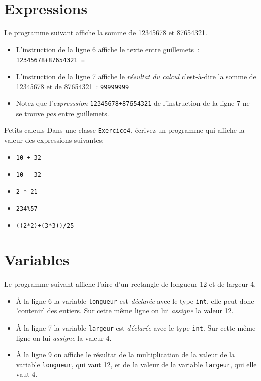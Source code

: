 \documentclass[a4paper,11pt]{article}
\begin{document}
\section{Expressions}

	Le programme suivant affiche la somme de 12345678 et 87654321.
	

	\begin{itemize}
		\item	L'instruction de la ligne 6 affiche le texte entre guillemets~: \texttt{12345678+87654321 = }
	
		\item L'instruction de la ligne 7 affiche le \emph{résultat du calcul} 
			c'est-à-dire la somme de 12345678 et de 87654321~:  \texttt{99999999}
	
		\item Notez que l'\emph{expresssion} \texttt{12345678+87654321} 
			de l'instruction de la ligne 7 ne se trouve \emph{pas} entre guillemets.
	\end{itemize}


	\begin{Exercice}{Petits calculs}
		Dans une classe \texttt{Exercice4}, écrivez un programme qui affiche la valeur des expressions
		suivantes:
		\begin{itemize}
			\item	 \texttt{10 + 32}
			\item	 \texttt{10 - 32}
			\item  \texttt{2 * 21}
			\item  \texttt{234\%57}
			\item  \texttt{((2*2)+(3*3))/25}
		\end{itemize}
	\end{Exercice}
	

\section{Variables}

	Le programme suivant affiche l'aire d'un rectangle de longueur 12 et de largeur 4.
	

	\begin{itemize}
		\item \`A la ligne 6 la variable \texttt{longueur} est \emph{déclarée} 
			avec le type \texttt{int}, elle peut donc 'contenir' des entiers. 
			Sur cette même ligne on lui \emph{assigne} la valeur 12.  

		\item \`A la ligne 7 la variable \texttt{largeur} est \emph{déclarée} avec le type \texttt{int}. 
			Sur cette même ligne on lui \emph{assigne} la valeur 4.
	
		\item \`A la ligne 9 on affiche le résultat de la multiplication de la valeur de la variable \texttt{longueur}, 
			qui vaut 12, et de la valeur de la variable \texttt{largeur}, qui elle vaut 4.  
  	\end{itemize}
\end{document}
